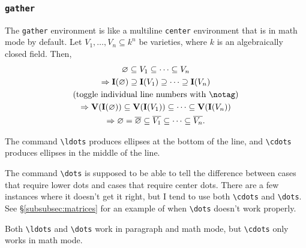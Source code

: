 \documentclass{article} 		%
\begin{document}
\subsubsection{\texttt{gather}} \label{subsubsec:gather}
The \texttt{gather} environment is like a multiline \texttt{center} environment that is in math mode by default. Let $V_1,\dots,V_n \subseteq k^n$ be varieties, where $k$ is an algebraically closed field. Then, 
\begin{gather}
	\varnothing \subseteq V_1 \subseteq \cdots \subseteq V_n \\
	\Rightarrow \mathbf{I}(\varnothing) \supseteq \mathbf{I}(V_1) \supseteq \cdots \supseteq \mathbf{I}(V_n) \\
	\text{(toggle individual line numbers with \texttt{\textbackslash notag})} \notag \\
	\Rightarrow \mathbf{V}(\mathbf{I}(\varnothing)) \subseteq \mathbf{V}(\mathbf{I}(V_1)) \subseteq \cdots \subseteq \mathbf{V}(\mathbf{I}(V_n)) \\
	\Rightarrow \varnothing = \overline{\varnothing} \subseteq \overline{V_1} \subseteq \cdots \subseteq \overline{V_n}. 
\end{gather}
\begin{notation}[Dots]
	The command \verb$\ldots$ produces ellipses at the bottom of the line, and \verb$\cdots$ produces ellipses in the middle of the line. \par
	The command \verb$\dots$ is supposed to be able to tell the difference between cases that require lower dots and cases that require center dots. There are a few instances where it doesn't get it right, but I tend to use both \verb$\cdots$ and \verb$\dots$. See \S\ref{subsubsec:matrices} for an example of when \verb$\dots$ doesn't work properly. \par
	Both \verb$\ldots$ and \verb$\dots$ work in paragraph and math mode, but \verb$\cdots$ only works in math mode. 
\end{notation}
\end{document}
